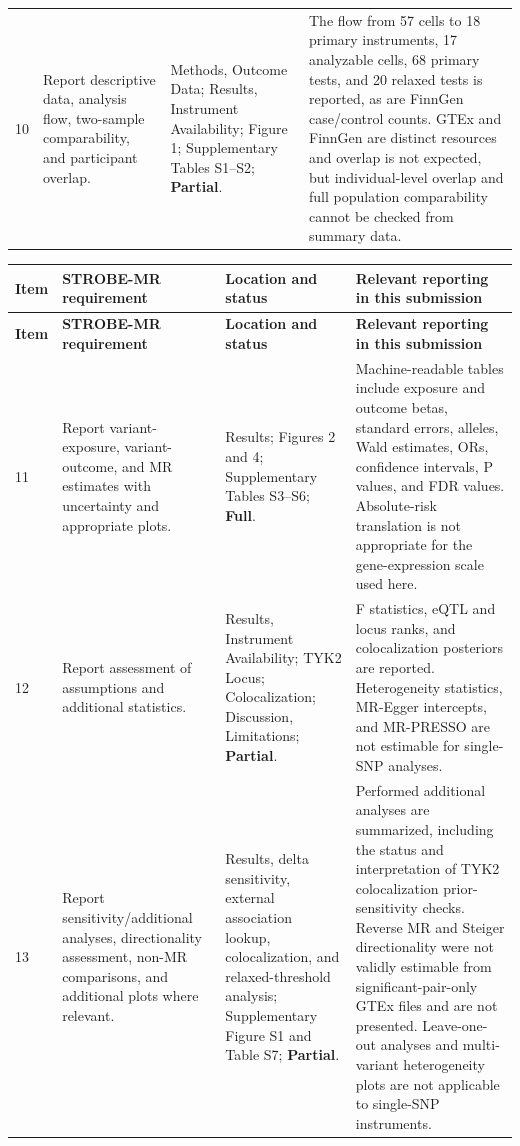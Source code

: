 \documentclass[10pt,a4paper,landscape]{article}
\begin{document}
\begin{longtable}{L{0.8cm}L{5.4cm}L{7.0cm}L{11.0cm}}
10 & Report descriptive data, analysis flow, two-sample comparability, and participant overlap. & Methods, Outcome Data; Results, Instrument Availability; Figure 1; Supplementary Tables S1--S2; \textbf{Partial}. & The flow from 57 cells to 18 primary instruments, 17 analyzable cells, 68 primary tests, and 20 relaxed tests is reported, as are FinnGen case/control counts. GTEx and FinnGen are distinct resources and overlap is not expected, but individual-level overlap and full population comparability cannot be checked from summary data. \\

\end{longtable}

\newpage
\begin{longtable}{L{0.8cm}L{5.4cm}L{7.0cm}L{11.0cm}}
\toprule
\textbf{Item} & \textbf{STROBE-MR requirement} & \textbf{Location and status} & \textbf{Relevant reporting in this submission} \\
\midrule
\endfirsthead
\toprule
\textbf{Item} & \textbf{STROBE-MR requirement} & \textbf{Location and status} & \textbf{Relevant reporting in this submission} \\
\midrule
\endhead
\bottomrule
\endfoot

11 & Report variant-exposure, variant-outcome, and MR estimates with uncertainty and appropriate plots. & Results; Figures 2 and 4; Supplementary Tables S3--S6; \textbf{Full}. & Machine-readable tables include exposure and outcome betas, standard errors, alleles, Wald estimates, ORs, confidence intervals, P values, and FDR values. Absolute-risk translation is not appropriate for the gene-expression scale used here. \\

12 & Report assessment of assumptions and additional statistics. & Results, Instrument Availability; TYK2 Locus; Colocalization; Discussion, Limitations; \textbf{Partial}. & F statistics, eQTL and locus ranks, and colocalization posteriors are reported. Heterogeneity statistics, MR-Egger intercepts, and MR-PRESSO are not estimable for single-SNP analyses. \\

13 & Report sensitivity/additional analyses, directionality assessment, non-MR comparisons, and additional plots where relevant. & Results, delta sensitivity, external association lookup, colocalization, and relaxed-threshold analysis; Supplementary Figure S1 and Table S7; \textbf{Partial}. & Performed additional analyses are summarized, including the status and interpretation of TYK2 colocalization prior-sensitivity checks. Reverse MR and Steiger directionality were not validly estimable from significant-pair-only GTEx files and are not presented. Leave-one-out analyses and multi-variant heterogeneity plots are not applicable to single-SNP instruments. \\


\end{longtable}
\end{document}
